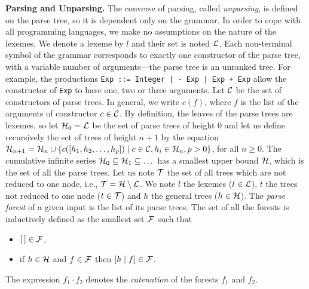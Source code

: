 \textbf{Parsing and Unparsing.} The converse of parsing, called
\emph{unparsing}, is defined on the parse tree, so it is dependent
only on the grammar. In order to cope with all programming languages,
we make no assumptions on the nature of the lexemes. We denote a
lexeme by \(l\) and their set is noted \(\cal L\). Each
non\hyp{}terminal symbol of the grammar corresponds to exactly one
constructor of the parse tree, with a variable number of
arguments---the parse tree is an unranked tree. For example, the
productions \verb/Exp ::= Integer | - Exp | Exp + Exp/ allow the
constructor of \texttt{Exp} to have one, two or three arguments. Let
\({\cal C}\) be the set of constructors of parse trees. In general, we
write \(c(f)\), where \(f\) is the list of the arguments of
constructor \(c \in {\cal C}\). By definition, the leaves of the parse
trees are lexemes, so let \({\cal H}_0 = {\cal L}\) be the set of
parse trees of height \(0\) and let us define recursively the set of
trees of height \(n+1\) by the equation \({\cal H}_{n+1} = {\cal H}_n
\cup \{c([h_1, h_2, \dots, h_p]) \mid c \in {\cal C}, h_i \in {\cal
  H}_n, p > 0\}\), for all \(n \geqslant 0\). The cumulative infinite
series \({\cal H}_0 \subseteq {\cal H}_1 \subseteq \dots\) has a
smallest upper bound \(\cal H\), which is the set of all the parse
trees. Let us note \(\cal T\) the set of all trees which are not
reduced to one node, i.e., \({\cal T} = {\cal H} \setminus {\cal
  L}\). We note \(l\) the lexemes (\(l \in {\cal L}\)), \(t\) the
trees not reduced to one node (\(t \in {\cal T}\)) and \(h\) the
general trees (\(h \in {\cal H}\)). The \emph{parse forest} of a given
input is the list of its parse trees. The set of all the forests is
inductively defined as the smallest set \(\cal F\) such that
\begin{itemize}

  \item \(\el \in {\cal F}\),

  \item if \(h \in {\cal H}\) and \(f \in {\cal F}\) then
    \(\cons{h}{f} \in {\cal F}\).

\end{itemize}
The expression \(f_1 \cdot f_2\) denotes the \emph{catenation} of the
forests \(f_1\) and \(f_2\).

